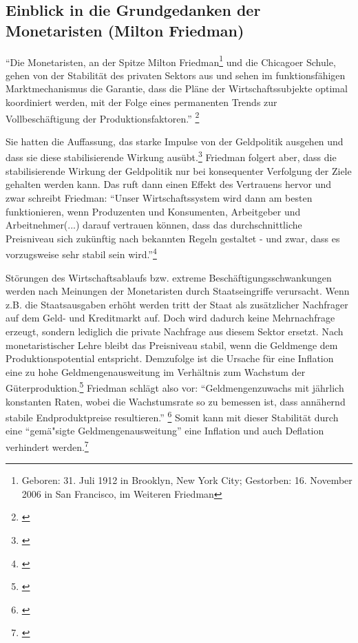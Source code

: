 \documentclass[
        onecolumn,
        a4paper,
        abstracton,
        parskip=half
        ,final
        ]{scrartcl}
\begin{document}
\subsection{Einblick in die Grundgedanken der Monetaristen (Milton Friedman)} %


"`Die Monetaristen, an der Spitze Milton Friedman\footnote[16]{Geboren: 31. Juli 1912 in Brooklyn, New York City; Gestorben: 16. November 2006 in San Francisco, im Weiteren Friedman} und die Chicagoer Schule,
gehen von der Stabilit{\"a}t des privaten Sektors aus und sehen im
funktionsf{\"a}higen Marktmechanismus die Garantie, dass die Pl{\"a}ne der
Wirtschaftssubjekte optimal koordiniert werden, mit der Folge eines
permanenten Trends zur Vollbesch{\"a}ftigung der Produktionsfaktoren."' \footnote[501]{\citep[Vgl.][S.210]{peters2000}}

Sie hatten die Auffassung, das starke Impulse von der Geldpolitik ausgehen und
dass sie diese stabilisierende Wirkung aus{\"u}bt.\footnote[502]{\citep[S.181]{bombach1981theorie}}
 Friedman folgert aber, dass die stabilisierende Wirkung der Geldpolitik nur bei konsequenter Verfolgung
der Ziele gehalten werden kann. Das ruft dann einen Effekt des Vertrauens
hervor und zwar schreibt Friedman: "`Unser Wirtschaftssystem wird dann am
besten funktionieren, wenn Produzenten und Konsumenten, Arbeitgeber und
Arbeitnehmer(...) darauf vertrauen k{\"o}nnen, dass das durchschnittliche
Preisniveau sich zuk{\"u}nftig nach bekannten Regeln gestaltet - und zwar, dass
es vorzugsweise sehr stabil sein wird."'\footnote[503]{\citep[vgl.][S.150]{friedman1970die}}

St{\"o}rungen des Wirtschaftsablaufs bzw. extreme Besch{\"a}ftigungsschwankungen
werden nach Meinungen der Monetaristen durch Staatseingriffe verursacht. Wenn
z.B. die Staatsausgaben erh{\"o}ht werden tritt der Staat als zus{\"a}tzlicher
Nachfrager auf dem Geld- und Kreditmarkt auf. Doch wird dadurch keine
Mehrnachfrage erzeugt, sondern lediglich die private Nachfrage aus diesem
Sektor ersetzt. Nach monetaristischer Lehre bleibt das Preisniveau stabil,
wenn die Geldmenge dem Produktionspotential entspricht. Demzufolge ist die
Ursache f{\"u}r eine Inflation eine zu hohe Geldmengenausweitung im Verh{\"a}ltnis zum
Wachstum der G{\"u}terproduktion.\footnote[504]{\citep[Vgl.][S.213]{peters2000}}
Friedman schl{\"a}gt also vor: "`Geldmengenzuwachs mit j{\"a}hrlich konstanten Raten, wobei die Wachstumsrate so zu bemessen ist, dass ann{\"a}hernd stabile Endproduktpreise resultieren."' \footnote[505]{\citep[vgl.][S.132]{friedman1970die}} Somit kann mit dieser
Stabilit{\"a}t durch eine "`gem{\"a}{"s}igte Geldmengenausweitung"' eine Inflation und auch
Deflation verhindert werden.\footnote[506]{\citep[vgl.][S.155]{friedman1970die}}
\end{document}
